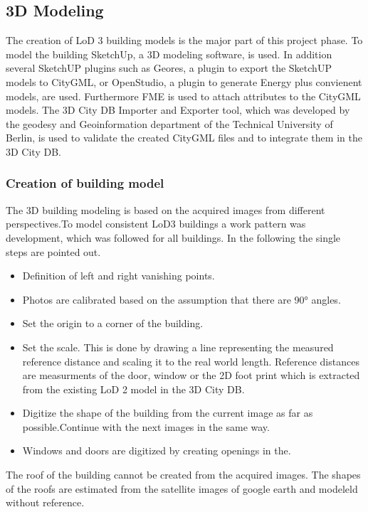 \subsection{3D Modeling}
The creation of LoD 3 building models is the major part of this project phase. To model the building SketchUp, a 3D modeling software, is used. In addition several SketchUP plugins such as Geores, a plugin to export the SketchUP models to CityGML, or OpenStudio, a plugin to generate Energy plus convienent models, are used. Furthermore FME is used to attach attributes to the CityGML models. The 3D City DB Importer and Exporter tool, which was developed by the geodesy and Geoinformation department of the Technical University of Berlin, is used to validate the created CityGML files and to integrate them in the 3D City DB.

\subsubsection{Creation of building model}
The 3D building modeling is based on the acquired images from different perspectives.To model consistent LoD3 buildings a work pattern was development, which was followed for all buildings. In the following the single steps are pointed out.
 
\begin{itemize}
\item Definition of left and right vanishing points.
\item Photos are calibrated based on the assumption that there are 90° angles.
\item Set the origin to a corner of the building. 
\item Set the scale. This is done by drawing a line representing the measured reference distance and scaling it to the real world length. Reference distances are measurments of the door, window or the 2D foot print which is extracted from the existing LoD 2 model in the 3D City DB.
\item Digitize the shape of the building from the current image as far as possible.Continue with the next images in the same way.
\item Windows and doors are digitized by creating openings in the. 
\end{itemize}

The roof of the building cannot be created from the acquired images. The shapes of the roofs are estimated from the satellite images of google earth and modeleld without reference.


